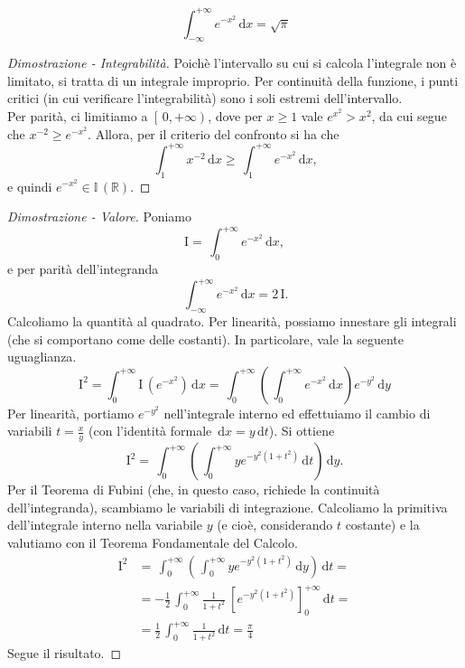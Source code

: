 \begin{Res}
	\label{res_1}
	\[
		\,\int_{-\infty}^{+\infty}e^{-x^2} \,\mathrm{d}x = \sqrt{\pi}
	\]
\end{Res}
\begin{proof}[Dimostrazione - Integrabilità]
	Poichè l'intervallo su cui si calcola l'integrale non è limitato, si tratta di un integrale improprio. Per continuità della funzione, i punti critici (in cui verificare l'integrabilità) sono i soli estremi dell'intervallo.\\
	Per parità, ci limitiamo a $\left[\,0,+\infty\right)$, dove per $x\geq1$ vale $e^{x^2}>x^2$, da cui segue che $x^{-2} \geq e^{-x^2}$. Allora, per il criterio del confronto si ha che \[\,\int_{1}^{+\infty} x^{-2} \,\mathrm{d}x \geq \,\int_{1}^{+\infty} e^{-x^2} \,\mathrm{d}x, \] e quindi $e^{-x^2}\in \mathbb{I}\,(\mathbb{R})$.
\end{proof}
\begin{proof}[Dimostrazione - Valore]
	Poniamo
	\[
		\mathrm{I} = \,\int_{0}^{+\infty}e^{-x^2} \,\mathrm{d}x,
	\]
	e per parità dell'integranda
	\[
		\,\int_{-\infty}^{+\infty}e^{-x^2} \,\mathrm{d}x = 2\,\mathrm{I}.
	\]
	Calcoliamo la quantità al quadrato. Per linearità, possiamo innestare gli integrali (che si comportano come delle costanti). In particolare, vale la seguente uguaglianza.
	\[
		\mathrm{I}^2 = \int_{0}^{+\infty}\mathrm{I}\,\left(e^{-x^2}\right) \,\mathrm{d}x=
		\,\int_{0}^{+\infty} \left( \,\int_{0}^{+\infty} e^{-x^2} \,\mathrm{d}x\right) e^{-y^2} \,\mathrm{d}y
	\]
	Per linearità, portiamo $e^{-y^2}$ nell'integrale interno ed effettuiamo il cambio di variabili $t=\frac{x}{y}$ (con l'identità formale $\,\mathrm{d}x=y\,\mathrm{d}t$). Si ottiene
	\[
		\mathrm{I}^2 =\,\int_{0}^{+\infty} \left( \,\int_{0}^{+\infty} ye^{-y^2(1+t^2)} \,\mathrm{d}t\right) \,\mathrm{d}y.
	\]
	Per il Teorema di Fubini (che, in questo caso, richiede la continuità dell'integranda), scambiamo le variabili di integrazione. Calcoliamo la primitiva dell'integrale interno nella variabile $y$ (e cioè, considerando $t$ costante) e la valutiamo con il Teorema Fondamentale del Calcolo.
	\[
		\begin{split}
			\mathrm{I}^2 & =\,\int_{0}^{+\infty} \left( \,\int_{0}^{+\infty} ye^{-y^2(1+t^2)} \,\mathrm{d}y\right) \,\mathrm{d}t= \\
			&=-\frac{1}{2}\,\int_{0}^{+\infty} \frac{1}{1+t^2} \ \left[ e^{-y^2(1+t^2)}\right]_{0}^{+\infty} \,\mathrm{d}t= \\
			&=\frac{1}{2}\,\int_{0}^{+\infty} \frac{1}{1+t^2}\,\mathrm{d}t = \frac{\pi}{4}
		\end{split}
	\]
	Segue il risultato.
\end{proof}
\pagebreak
